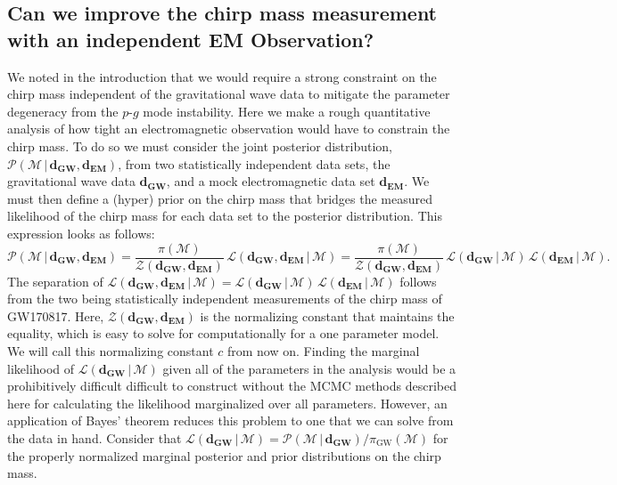 \subsection{Can we improve the chirp mass measurement with an independent EM Observation?}
We noted in the introduction that we would require a strong constraint on the chirp mass independent of the gravitational wave data to mitigate the parameter degeneracy from the $p$-$g$ mode instability. Here we make a rough quantitative analysis of how tight an electromagnetic observation would have to constrain the chirp mass. To do so we must consider the joint posterior distribution, $\mathcal{P}(\mathcal{M} \, | \,  \mathbf{d_{GW}}, \mathbf{d_{EM}})$, from two statistically independent data sets, the gravitational wave data $\mathbf{d_{GW}}$, and a mock electromagnetic data set $\mathbf{d_{EM}}$. We must then define a (hyper) prior on the chirp mass that bridges the measured likelihood of the chirp mass for each data set to the posterior distribution. This expression looks as follows:
\begin{equation}
    \mathcal{P}(\mathcal{M} \, | \,  \mathbf{d_{GW}}, \mathbf{d_{EM}}) = \frac{\pi(\mathcal{M})}{\mathcal{Z}(\mathbf{d_{GW}}, \mathbf{d_{EM}})}  \,  \mathcal{L}(\mathbf{d_{GW}}, \mathbf{d_{EM}} \, | \, \mathcal{M}) = \frac{\pi(\mathcal{M})}{\mathcal{Z}(\mathbf{d_{GW}}, \mathbf{d_{EM}})} \, \mathcal{L}(\mathbf{d_{GW}} \, | \, \mathcal{M}) \, \mathcal{L}(\mathbf{d_{EM}} \, | \, \mathcal{M}).
\end{equation}
The separation of $\mathcal{L}(\mathbf{d_{GW}}, \mathbf{d_{EM}} \, | \, \mathcal{M}) = \mathcal{L}(\mathbf{d_{GW}} \, | \, \mathcal{M}) \, \mathcal{L}(\mathbf{d_{EM}} \, | \, \mathcal{M})$ follows from the two being statistically independent measurements of the chirp mass of GW170817. Here, $\mathcal{Z}(\mathbf{d_{GW}}, \mathbf{d_{EM}})$ is the normalizing constant that maintains the equality, which is easy to solve for computationally for a one parameter model. We will call this normalizing constant $c$ from now on. Finding the marginal likelihood of $\mathcal{L}(\mathbf{d_{GW}} \, | \, \mathcal{M})$ given all of the parameters in the analysis would be a prohibitively difficult difficult to construct without the MCMC methods described here for calculating the likelihood marginalized over all parameters. However, an application of Bayes' theorem reduces this problem to one that we can solve from the data in hand. Consider that $\mathcal{L}(\mathbf{d_{GW}} \, | \, \mathcal{M}) = \mathcal{P}(\mathcal{M} \, | \, \mathbf{d_{GW}}) / \pi_{\mathrm{GW}} (\mathcal{M})$ for the properly normalized marginal posterior and prior distributions on the chirp mass.

